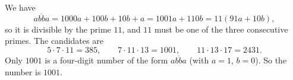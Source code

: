 We have
\[
\overline{abba}=1000a+100b+10b+a=1001a+110b=11(91a+10b),
\]
so it is divisible by the prime $11$, and $11$ must be one of the three consecutive primes. The candidates are
\[
5\cdot7\cdot11=385,\qquad 7\cdot11\cdot13=1001,\qquad 11\cdot13\cdot17=2431 .
\]
Only $1001$ is a four-digit number of the form $\overline{abba}$ (with $a=1$, $b=0$). So the number is $\boxed{1001}$.
